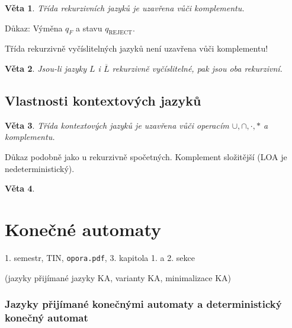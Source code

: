 \documentclass[a4paper, 11pt]{report}
\newtheorem{veta}{Věta}[chapter]
\begin{document}
\begin{veta}
Třída rekurzivních jazyků je uzavřena vůči komplementu.
\end{veta}
Důkaz: Výměna $q_F$ a stavu $q_\text{REJECT}$.

Třída rekurzivně vyčíslitelných jazyků není uzavřena vůči komplementu!

\begin{veta}
Jsou-li jazyky $L$ i $\overline{L}$ rekurzivně vyčíslitelné, pak jsou oba rekurzivní.
\end{veta}

\section{Vlastnosti kontextových jazyků}
\begin{veta}
Třída kontextových jazyků je uzavřena vůči operacím $\cup, \cap, \cdot, *$ a komplementu.
\end{veta}
Důkaz podobně jako u rekurzivně spočetných. Komplement složitější (LOA je nedeterministický).

\begin{veta}
\end{veta}











\chapter{Konečné automaty} \label{cha:18}

1. semestr, TIN, \texttt{opora.pdf}, 3. kapitola 1. a 2. sekce

(jazyky přijímané jazyky KA, varianty KA, minimalizace KA)

\subsection{Jazyky přijímané konečnými automaty a deterministický konečný automat}
\end{document}
